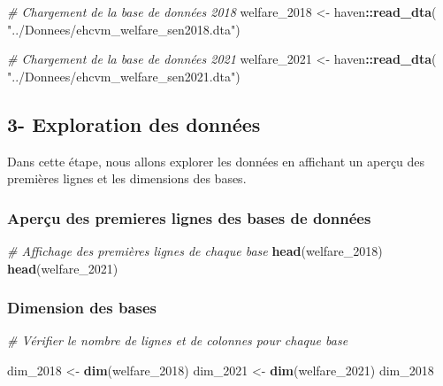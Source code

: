 \documentclass[
]{article}
\newenvironment{Shaded}{\begin{snugshade}}{\end{snugshade}}
\newcommand{\CommentTok}[1]{\textcolor[rgb]{0.56,0.35,0.01}{\textit{#1}}}
\newcommand{\FunctionTok}[1]{\textcolor[rgb]{0.13,0.29,0.53}{\textbf{#1}}}
\newcommand{\NormalTok}[1]{#1}
\newcommand{\OtherTok}[1]{\textcolor[rgb]{0.56,0.35,0.01}{#1}}
\newcommand{\SpecialCharTok}[1]{\textcolor[rgb]{0.81,0.36,0.00}{\textbf{#1}}}
\newcommand{\StringTok}[1]{\textcolor[rgb]{0.31,0.60,0.02}{#1}}
\begin{document}
\begin{Shaded}
\begin{Highlighting}[]
\CommentTok{\# Chargement de la base de données 2018}
\NormalTok{welfare\_2018 }\OtherTok{\textless{}{-}}\NormalTok{ haven}\SpecialCharTok{::}\FunctionTok{read\_dta}\NormalTok{(}
  \StringTok{"../Donnees/ehcvm\_welfare\_sen2018.dta"}\NormalTok{)}

\CommentTok{\# Chargement de la base de données 2021}
\NormalTok{welfare\_2021 }\OtherTok{\textless{}{-}}\NormalTok{ haven}\SpecialCharTok{::}\FunctionTok{read\_dta}\NormalTok{(}
  \StringTok{"../Donnees/ehcvm\_welfare\_sen2021.dta"}\NormalTok{)}
\end{Highlighting}
\end{Shaded}

\hypertarget{exploration-des-donnuxe9es}{%
\subsection{3- Exploration des
données}\label{exploration-des-donnuxe9es}}

Dans cette étape, nous allons explorer les données en affichant un
aperçu des premières lignes et les dimensions des bases.

\hypertarget{aperuxe7u-des-premieres-lignes-des-bases-de-donnuxe9es}{%
\subsubsection{Aperçu des premieres lignes des bases de
données}\label{aperuxe7u-des-premieres-lignes-des-bases-de-donnuxe9es}}

\begin{Shaded}
\begin{Highlighting}[]
\CommentTok{\# Affichage des premières lignes de chaque base}
\FunctionTok{head}\NormalTok{(welfare\_2018)}
\FunctionTok{head}\NormalTok{(welfare\_2021)}
\end{Highlighting}
\end{Shaded}

\hypertarget{dimension-des-bases}{%
\subsubsection{Dimension des bases}\label{dimension-des-bases}}

\begin{Shaded}
\begin{Highlighting}[]
\CommentTok{\# Vérifier le nombre de lignes et de colonnes pour chaque base}

\NormalTok{dim\_2018 }\OtherTok{\textless{}{-}} \FunctionTok{dim}\NormalTok{(welfare\_2018)}
\NormalTok{dim\_2021 }\OtherTok{\textless{}{-}} \FunctionTok{dim}\NormalTok{(welfare\_2021)}
\NormalTok{dim\_2018}
\end{Highlighting}
\end{Shaded}
\end{document}
